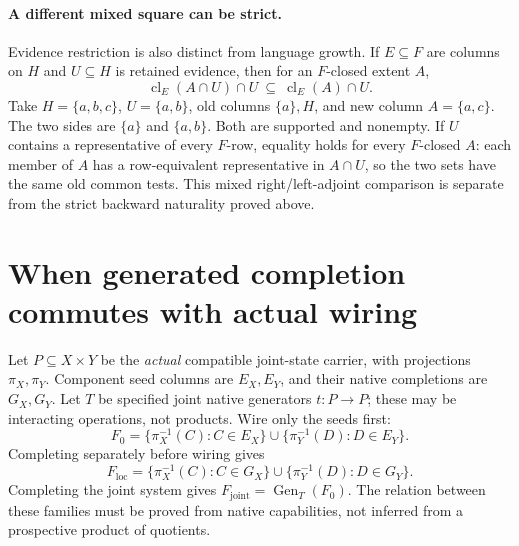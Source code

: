 \documentclass[11pt]{article}
\theoremstyle{definition}\newtheorem{definition}[theorem]{Definition}
\theoremstyle{remark}\newtheorem{remark}[theorem]{Remark}
\newcommand{\Gen}{\operatorname{Gen}}
\newcommand{\cl}{\operatorname{cl}}
\begin{document}
\paragraph{A different mixed square can be strict.}
Evidence restriction is also distinct from language growth. If $E\subseteq F$
are columns on $H$ and $U\subseteq H$ is retained evidence, then for an
$F$-closed extent $A$,
\[
 \cl_E(A\cap U)\cap U\ \subseteq\ \cl_E(A)\cap U.
\]
Take $H=\{a,b,c\}$, $U=\{a,b\}$, old columns $\{a\},H$, and new
column $A=\{a,c\}$. The two sides are $\{a\}$ and $\{a,b\}$.
Both are supported and nonempty. If $U$ contains a representative of
every $F$-row, equality holds for every $F$-closed $A$: each member of
$A$ has a row-equivalent representative in $A\cap U$, so the two sets
have the same old common tests. This mixed right/left-adjoint comparison
is separate from the strict backward naturality proved above.


\section{When generated completion commutes with actual wiring}\label{sec:wiring}
Let $P\subseteq X\times Y$ be the \emph{actual} compatible joint-state
carrier, with projections $\pi_X,\pi_Y$. Component seed columns are
$E_X,E_Y$, and their native completions are $G_X,G_Y$.
Let $T$ be specified joint native generators $t:P\to P$; these may
be interacting operations, not products. Wire only the seeds first:
\[
 F_0=\{\pi_X^{-1}(C):C\in E_X\}
       \cup\{\pi_Y^{-1}(D):D\in E_Y\}.
\]
Completing separately before wiring gives
\[
 F_{\mathrm{loc}}=\{\pi_X^{-1}(C):C\in G_X\}
       \cup\{\pi_Y^{-1}(D):D\in G_Y\}.
\]
Completing the joint system gives $F_{\mathrm{joint}}=\Gen_T(F_0)$.
The relation between these families must be proved from native
capabilities, not inferred from a prospective product of quotients.
\end{document}
